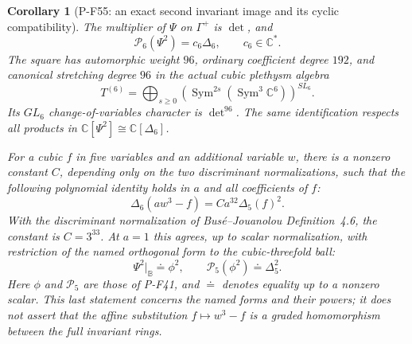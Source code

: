 \documentclass[11pt,a4paper]{article}
\newtheorem{corollary}[proposition]{Corollary}
\begin{document}
\begin{corollary}[P-F55: an exact second invariant image and its cyclic compatibility]
\label{cor:fourfold-theta-discriminant}
The multiplier of $\Psi$ on $\Gamma^+$ is $\det$, and
\[
          \mathcal P_6(\Psi^2)=c_6\Delta_6,
                    \qquad c_6\in\mathbb C^*.
 \tag{P-F55b}
\]
The square has automorphic weight $96$, ordinary coefficient
degree $192$, and canonical stretching degree $96$ in the
actual cubic plethysm algebra
\[
       T^{(6)}=\bigoplus_{s\ge0}
        \left(\operatorname{Sym}^{2s}
                    (\operatorname{Sym}^3\mathbb C^6)\right)^{SL_6}.
 \tag{P-F55c}
\]
Its $GL_6$ change-of-variables character is $\det^{96}$.
The same identification respects all products in
$\mathbb C[\Psi^2]\cong\mathbb C[\Delta_6]$.

For a cubic $f$ in five variables and an additional variable $w$,
there is a nonzero constant $C$, depending only on the two
discriminant normalizations, such that the following polynomial
identity holds in $a$ and all coefficients of $f$:
\[
           \Delta_6(a w^3-f)=C a^{32}\Delta_5(f)^2.
 \tag{P-F55d}
\]
With the discriminant normalization of Bus\'e--Jouanolou
Definition~4.6, the constant is $C=3^{33}$.
At $a=1$ this agrees, up to scalar normalization, with restriction
of the named orthogonal form to the cubic-threefold ball:
\[
        \Psi^2|_{\mathbb B}\doteq\phi^2,
        \qquad \mathcal P_5(\phi^2)\doteq\Delta_5^2.
 \tag{P-F55e}
\]
Here $\phi$ and $\mathcal P_5$ are those of P-F41, and
$\doteq$ denotes equality up to a nonzero scalar. This last
statement concerns the named forms and their powers; it does not
assert that the affine substitution $f\mapsto w^3-f$ is a graded
homomorphism between the full invariant rings.
\end{corollary}
\end{document}
